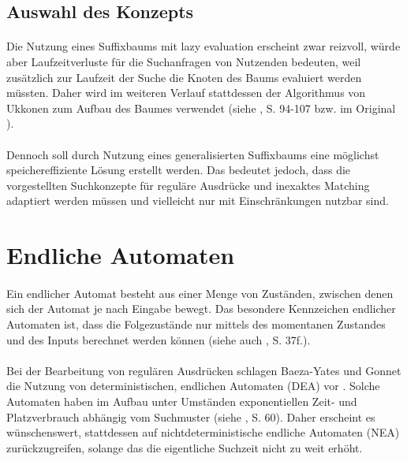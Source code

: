 \subsection{Auswahl des Konzepts}

\paragraph{} Die Nutzung eines Suffixbaums mit lazy evaluation erscheint zwar reizvoll, würde aber Laufzeitverluste für die Suchanfragen von Nutzenden bedeuten, weil zusätzlich zur Laufzeit der Suche die Knoten des Baums evaluiert werden müssten. Daher wird im weiteren Verlauf stattdessen der Algorithmus von Ukkonen zum Aufbau des Baumes verwendet (siehe \cite{gusfield}, S. 94-107 bzw. im Original \cite{ukkonen}).
\paragraph{} Dennoch soll durch Nutzung eines generalisierten Suffixbaums eine möglichst speichereffiziente Lösung erstellt werden. Das bedeutet jedoch, dass die vorgestellten Suchkonzepte für reguläre Ausdrücke und inexaktes Matching adaptiert werden müssen und vielleicht nur mit Einschränkungen nutzbar sind.

\section{Endliche Automaten}
\label{meth-automata}

\paragraph{} Ein endlicher Automat besteht aus einer Menge von Zuständen, zwischen denen sich der Automat je nach Eingabe bewegt. Das besondere Kennzeichen endlicher Automaten ist, dass die Folgezustände nur mittels des momentanen Zustandes und des Inputs berechnet werden können (siehe auch \cite{automata}, S. 37f.).
\paragraph{} Bei der Bearbeitung von regulären Ausdrücken schlagen Baeza-Yates und Gonnet die Nutzung von deterministischen, endlichen Automaten (DEA) vor \cite{baeza-yates}. Solche Automaten haben im Aufbau unter Umständen exponentiellen Zeit- und Platzverbrauch abhängig vom Suchmuster (siehe \cite{automata}, S. 60). Daher erscheint es wünschenswert, stattdessen auf nichtdeterministische endliche Automaten (NEA) zurückzugreifen, solange das die eigentliche Suchzeit nicht zu weit erhöht.

